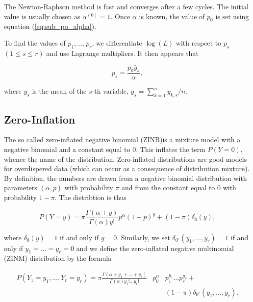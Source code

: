 \documentclass[12pt]{article}
\begin{document}
\begin{appendices}
    The Newton-Raphson method is fast and converges after a few
    cycles. The initial value is usually chosen as
    $\alpha^{(0)} = 1$.
    Once $\alpha$ is known, the value of $p_0$ is set using
    equation (\ref{eq:sub_po_alpha}).

    To find the values of $p_1, \ldots, p_r$, we differentiate
    $\log(L)$ with respect to $p_s$ $(1 \leq s \leq r)$ and use
    Lagrange multipliers. It then appears that

    \begin{equation}
      p_s = \frac{p_0 \bar{y}_s}{\alpha},
    \end{equation}

    \noindent
    where $\bar{y}_s$ is the mean of the $s$-th variable,
    $\bar{y}_s = \sum_{k=1}^n y_{k,s}/n$.

\subsection{Zero-Inflation}

    The so called zero-inflated negative binomial (ZINB)is a mixture
    model with a negative binomial and a constant equal to 0. This 
    inflates the term $P(Y=0)$, whence the name of the distribution.
    Zero-inflated distributions are good models for overdispered
    data (which can occur as a consequence of distribution mixture).
    By definition, the numbers are drawn from a negative binomial
    distribution with parameters $(\alpha, p)$ with probability
    $\pi$ and from the constant equal to 0 with probability
    $1-\pi$. The distribtion is thus

    \begin{equation*}
    P(Y = y) = \pi\frac{\Gamma(\alpha+y)}{\Gamma(\alpha)y!}
    p^{\alpha}(1-p)^y + (1-\pi)\delta_0(y),
    \end{equation*}

    \noindent
    where $\delta_0(y) = 1$ if and only if $y=0$. Similarly,
    we set $\delta_{0^r}(y_1, \ldots, y_r) = 1$ if and only
    if $y_1=\ldots =y_r = 0$ and we define the zero-inflated negative
    multinomial (ZINM) distribution by the formula

    \begin{eqnarray}
      P(Y_1 = y_1, \ldots, Y_r = y_r) = \pi
       \frac{\Gamma(\alpha+y_1+\ldots+y_r)}
       {\Gamma(\alpha)y_1!\ldots y_r!}
\label{eq:zinm}
       &p_0^{\alpha}& p_1^{y_1} \ldots p_r^{y_r} + \\
       &\;& (1-\pi)\delta_{0^r}(y_1, \ldots, y_r). \nonumber
    \end{eqnarray}


\end{appendices}
\end{document}
